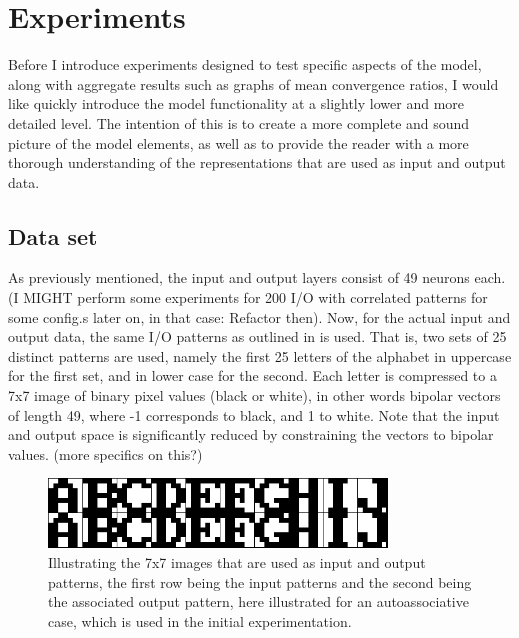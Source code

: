 \section{Experiments}\label{section:experiments}

Before I introduce experiments designed to test specific aspects of the model, along with aggregate results such as graphs of mean convergence ratios, I would like quickly introduce the model functionality at a slightly lower and more detailed level. The intention of this is to create a more complete and sound picture of the model elements, as well as to provide the reader with a more thorough understanding of the representations that are used as input and output data. 

\subsection{Data set}
As previously mentioned, the input and output layers consist of 49 neurons each. (I MIGHT perform some experiments for 200 I/O with correlated patterns for some config.s later on, in that case: Refactor then). Now, for the actual input and output data, the same I/O patterns as outlined in \citep{Hattori2010, Hattori2014} is used. That is, two sets of 25 distinct patterns are used, namely the first 25 letters of the alphabet in uppercase for the first set, and in lower case for the second. Each letter is compressed to a 7x7 image of binary pixel values (black or white), in other words bipolar vectors of length 49, where -1 corresponds to black, and 1 to white. Note that the input and output space is significantly reduced by constraining the vectors to bipolar values. (more specifics on this?)

\begin{figure}\label{fig:sample_letters}
    \centering
    \includegraphics[width=9cm]{fig/im_both.png}
    \caption{Illustrating the 7x7 images that are used as input and output patterns, the first row being the input patterns and the second being the associated output pattern, here illustrated for an autoassociative case, which is used in the initial experimentation.}
\end{figure}

